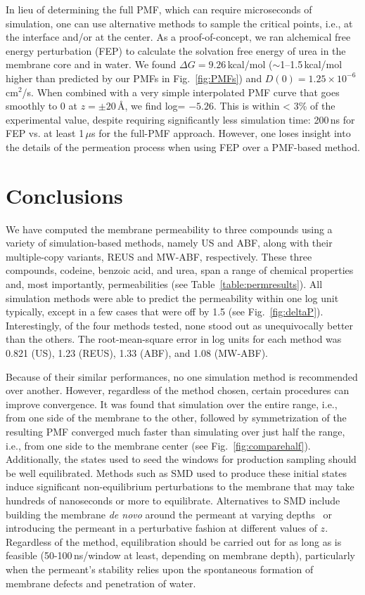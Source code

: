 \par In lieu of determining the full PMF, which can require microseconds of simulation, one can use alternative methods to sample the critical points, i.e., at the interface and/or at the center.  As a proof-of-concept, we ran alchemical free energy perturbation (FEP) to calculate the solvation free energy of urea in the membrane core and in water.  We found $\Delta G = 9.26$\,kcal/mol ($\sim$1--1.5\,kcal/mol higher than predicted by our PMFs in Fig.~\ref{fig:PMFs}) and $D(0) = 1.25\times 10^{-6}$\,cm$^2$/s.  When combined with a very simple interpolated PMF curve that goes smoothly to 0 at $z=\pm20$\,\AA, we find log\perm = $-5.26$.  This is within < 3\% of the experimental value, despite requiring significantly less simulation time: 200\,ns for FEP vs. at least 1\,$\mu$s for the full-PMF approach.  However, one loses insight into the details of the permeation process when using FEP over a PMF-based method.




\section{Conclusions}

We have computed the membrane permeability to three compounds using a variety of simulation-based methods, namely US and ABF, along with their multiple-copy variants, REUS and MW-ABF, respectively.  These three compounds, codeine, benzoic acid, and urea, span a range of chemical properties and, most importantly, permeabilities (see Table~\ref{table:permresults}).  All simulation methods were able to predict the permeability within one log unit typically, except in a few cases that were off by 1.5 (see Fig.~\ref{fig:deltaP}).  Interestingly, of the four methods tested, none stood out as unequivocally better than the others.  The root-mean-square error in log units for each method was 0.821 (US), 1.23 (REUS), 1.33 (ABF), and 1.08 (MW-ABF).

Because of their similar performances, no one simulation method is recommended over another.  However, regardless of the method chosen, certain procedures can improve convergence.   It was found that simulation over the entire range, i.e., from one side of the membrane to the other, followed by symmetrization of the resulting PMF converged much faster than simulating over just half the range, i.e., from one side to the membrane center (see Fig.~\ref{fig:comparehalf}).  Additionally, the states used to seed the windows for production sampling should be well equilibrated.  Methods such as SMD used to produce these initial states induce significant non-equilibrium perturbations to the membrane that may take hundreds of nanoseconds or more to equilibrate.  Alternatives to SMD include building the membrane {\it de novo} around the permeant at varying depths~\cite{Dorairaj2007} or introducing the permeant in a perturbative fashion at different values of $z$.  Regardless of the method, equilibration should be carried out for as long as is feasible (50-100\,ns/window at least, depending on membrane depth), particularly when the permeant's stability relies upon the spontaneous formation of membrane defects and penetration of water.

